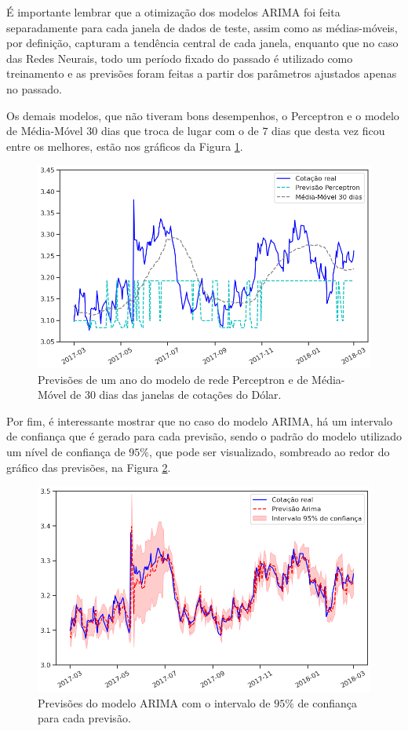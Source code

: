 É importante lembrar que a otimização dos modelos ARIMA foi feita separadamente para cada janela de dados de teste, assim como as médias-móveis, por definição, capturam a tendência central de cada janela, enquanto que no caso das Redes Neurais, todo um período fixado do passado é utilizado como treinamento e as previsões foram feitas a partir dos parâmetros ajustados apenas no passado.

Os demais modelos, que não tiveram bons desempenhos, o Perceptron e o modelo de Média-Móvel $30$ dias que troca de lugar com o de $7$ dias que desta vez ficou entre os melhores, estão nos gráficos da Figura \ref{fig:previsoes_ano_2}.

\begin{figure}[htb]
\centering
\includegraphics[width=14cm]{figuras/series_previsoes_ano_2}
\caption{Previsões de um ano do modelo de rede Perceptron e de Média-Móvel de $30$ dias das janelas de cotações do Dólar.}
\label{fig:previsoes_ano_2}
\end{figure}

Por fim, é interessante mostrar que no caso do modelo ARIMA, há um intervalo de confiança que é gerado para cada previsão, sendo o padrão do modelo utilizado um nível de confiança de $95\%$, que pode ser visualizado, sombreado ao redor do gráfico das previsões, na Figura \ref{fig:series_arima_ano}.

\begin{figure}[htb]
\centering
\includegraphics[width=14cm]{figuras/series_arima_ano}
\caption{Previsões do modelo ARIMA com o intervalo de $95\%$ de confiança para cada previsão.}
\label{fig:series_arima_ano}
\end{figure}


